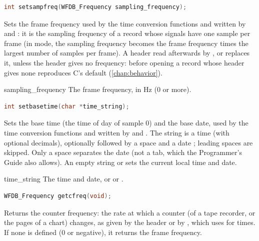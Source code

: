 \begin{lstlisting}[language=C,style=signature]
int setsampfreq(WFDB_Frequency sampling_frequency);
\end{lstlisting}
Sets the frame frequency used by the time conversion functions and written
by  and : it is the sampling frequency of a
record whose signals have one sample per frame (in  mode,
the sampling frequency becomes the frame frequency times the largest number
of samples per frame). A header read afterwards by ,  or
 replaces it, unless the
header gives no frequency:  before opening a record
whose header gives none reproduces C's default (\cref{chap:behavior}).
\begin{params}
\item[sampling\_frequency] The frame frequency, in Hz (0 or more).
\end{params}

\begin{lstlisting}[language=C,style=signature]
int setbasetime(char *time_string);
\end{lstlisting}
Sets the base time (the time of day of sample 0) and the base date, used by
the time conversion functions and written by  and
. The string is a time  (with optional
decimals), optionally followed by a space and a date ;
leading spaces are skipped. Only a space separates the date (not a tab, which
the Programmer's Guide also allows). An empty string or  sets the
current local time and date.
\begin{params}
\item[time\_string] The time and date, or  or .
\end{params}
\returns{0 on success; -1 if neither a time nor a date can be read from the
string (and it does not begin with \code{[}).}

\begin{lstlisting}[language=C,style=signature]
WFDB_Frequency getcfreq(void);
\end{lstlisting}
Returns the counter frequency: the rate at which a counter (of a tape
recorder, or the pages of a chart) changes, as given by the header or by
, which  uses for  times. If none is
defined (0 or negative), it returns the frame frequency.

